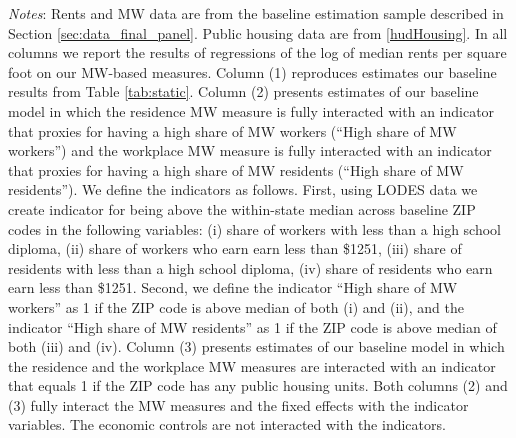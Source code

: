 \begin{table}[hbt!]
    \begin{minipage}{.95\textwidth} \footnotesize
        \vspace{2mm}
        \textit{Notes}: 
        Rents and MW data are from the baseline estimation sample described in Section 
        \ref{sec:data_final_panel}.
        Public housing data are from \ref{hudHousing}.
        In all columns we report the results of regressions of the log of median rents 
        per square foot on our MW-based measures.
        Column (1) reproduces estimates our baseline results from Table \ref{tab:static}.
        Column (2) presents estimates of our baseline model in which the residence MW 
        measure is fully interacted with an indicator that proxies for having a high share 
        of MW workers (``High share of MW workers'') and the workplace MW measure is 
        fully interacted with an indicator that proxies for having a high share of MW 
        residents (``High share of MW residents'').
        We define the indicators as follows.
        First, using LODES data we create indicator for being above the within-state 
        median across baseline ZIP codes in the following variables: (i) share of workers 
        with less than a high school diploma, (ii) share of workers who earn earn less 
        than \$1251, (iii) share of residents with less than a high school diploma, (iv) 
        share of residents who earn earn less than \$1251.
        Second, we define the indicator ``High share of MW workers'' as 1 if the ZIP
        code is above median of both (i) and (ii), and the indicator ``High share of MW 
        residents'' as 1 if the ZIP code is above median of both (iii) and (iv).
        Column (3) presents estimates of our baseline model in which the residence and 
        the workplace MW measures are interacted with an indicator that equals 1 if 
        the ZIP code has any public housing units.
        Both columns (2) and (3) fully interact the MW measures and the fixed effects
        with the indicator variables. The economic controls are not interacted with 
        the indicators.
    \end{minipage}
\end{table}
